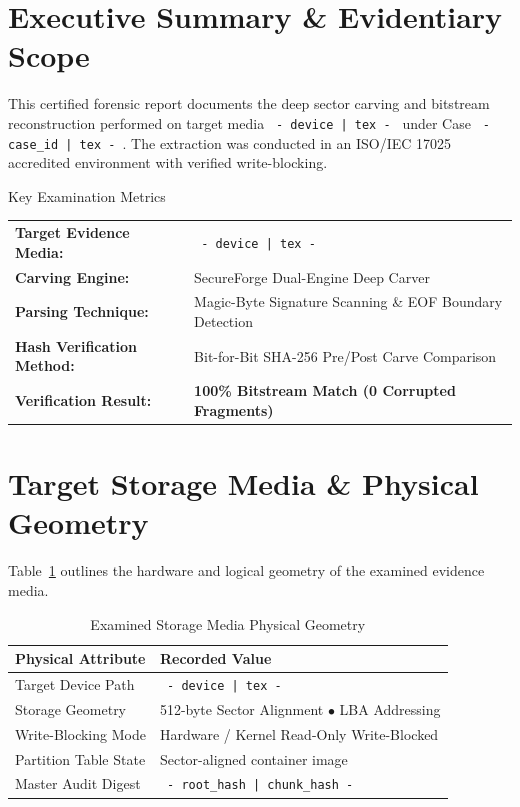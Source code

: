 \documentclass[12pt]{article}
\begin{document}
\clearpage
\tableofcontents
\clearpage


\section{Executive Summary \& Evidentiary Scope}

This certified forensic report documents the deep sector carving and bitstream reconstruction performed on target media \texttt{ {{- device | tex -}} } under Case \texttt{ {{- case_id | tex -}} }. The extraction was conducted in an ISO/IEC 17025 accredited environment with verified write-blocking.

\vspace{0.3cm}
\begin{infocard}{Key Examination Metrics}
\noindent
\begin{tabularx}{\textwidth}{lX}
\textbf{Target Evidence Media:} & \texttt{ {{- device | tex -}} } \tabularnewline
\textbf{Carving Engine:} & SecureForge Dual-Engine Deep Carver \tabularnewline
\textbf{Parsing Technique:} & Magic-Byte Signature Scanning \& EOF Boundary Detection \tabularnewline
\textbf{Hash Verification Method:} & Bit-for-Bit SHA-256 Pre/Post Carve Comparison \tabularnewline
\textbf{Verification Result:} & \textcolor{brandsecondary}{\textbf{100\% Bitstream Match (0 Corrupted Fragments)}} \tabularnewline
\end{tabularx}
\end{infocard}

\section{Target Storage Media \& Physical Geometry}

Table~\ref{tab:device_specs} outlines the hardware and logical geometry of the examined evidence media.

\begin{table}[H]
\centering
\caption{Examined Storage Media Physical Geometry}
\label{tab:device_specs}
\noindent
\begin{tabularx}{\textwidth}{lX}
\toprule
\textbf{Physical Attribute} & \textbf{Recorded Value} \tabularnewline
\midrule
Target Device Path & \texttt{ {{- device | tex -}} } \tabularnewline
Storage Geometry & 512-byte Sector Alignment $\bullet$ LBA Addressing \tabularnewline
Write-Blocking Mode & Hardware / Kernel Read-Only Write-Blocked \tabularnewline
Partition Table State & Sector-aligned container image \tabularnewline
Master Audit Digest & {\small\texttt{ {{- root_hash | chunk_hash -}} }} \tabularnewline
\bottomrule
\end{tabularx}
\end{table}
\end{document}
